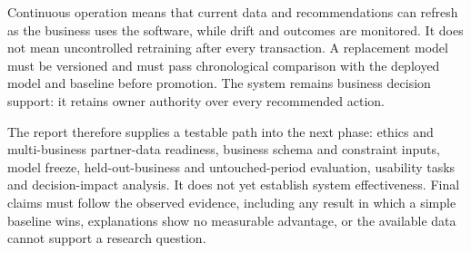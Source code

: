 Continuous operation means that current data and recommendations can refresh as
the business uses the software, while drift and outcomes are monitored. It does
not mean uncontrolled retraining after every transaction. A replacement model
must be versioned and must pass chronological comparison with the deployed model
and baseline before promotion. The system remains business decision support: it
retains owner authority over every recommended action.

The report therefore supplies a testable path into the next phase: ethics and
multi-business partner-data readiness, business schema and constraint inputs,
model freeze, held-out-business and untouched-period evaluation, usability tasks and
decision-impact analysis. It does not yet establish system effectiveness. Final
claims must follow the observed evidence, including any result in which a simple
baseline wins, explanations show no measurable advantage, or the available data
cannot support a research question.
